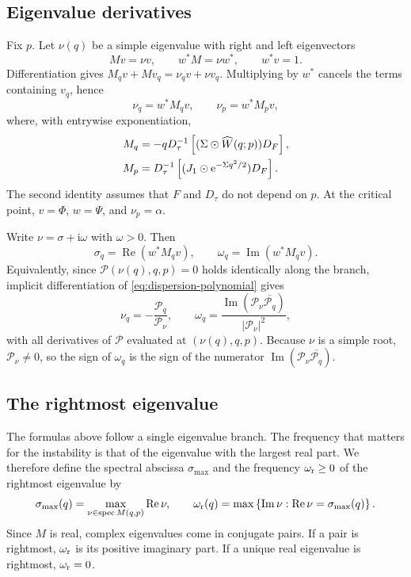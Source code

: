 \documentclass[11pt]{article}
\newcommand{\ii}{\mathrm{i}}
\newcommand{\ee}{\mathrm{e}}
\DeclareMathOperator{\RePart}{Re}
\begin{document}
\subsection{Eigenvalue derivatives}
Fix $p$. Let $\nu(q)$ be a simple eigenvalue with right and left eigenvectors
\begin{equation}
 Mv=\nu v,\qquad w^*M=\nu w^*,\qquad w^*v=1.
\end{equation}
Differentiation gives $M_qv+Mv_q=\nu_qv+\nu v_q$. Multiplying by $w^*$
cancels the terms containing $v_q$, hence
\begin{equation}
 \boxed{\nu_q=w^*M_qv,\qquad \nu_p=w^*M_pv,}
 \label{eq:dispersion-derivatives}
\end{equation}
where, with entrywise exponentiation,
\begin{align}
 M_q&=-qD_\tau^{-1}\left[(\Sigma\odot\widehat W(q;p))D_F\right],\notag\\
 M_p&=D_\tau^{-1}\left[(J_1\odot\ee^{-\Sigma q^2/2})D_F\right].
 \label{eq:dispersion-matrix-derivatives}
\end{align}
The second identity assumes that $F$ and $D_\tau$ do not depend on $p$.
At the critical point, $v=\Phi$, $w=\Psi$, and $\nu_p=\alpha$.

Write $\nu=\sigma+\ii\omega$ with $\omega>0$. Then
\begin{equation}
 \sigma_q=\RePart(w^*M_qv),\qquad
 \boxed{\omega_q=\operatorname{Im}(w^*M_qv).}
 \label{eq:frequency-slope}
\end{equation}
Equivalently, since $\mathcal P(\nu(q),q,p)=0$ holds identically along the
branch, implicit differentiation of \eqref{eq:dispersion-polynomial} gives
\begin{equation}
 \nu_q=-\frac{\mathcal P_q}{\mathcal P_\nu},\qquad
 \boxed{\omega_q=
 \frac{\operatorname{Im}(\mathcal P_\nu\overline{\mathcal P_q})}
 {|\mathcal P_\nu|^2},}
 \label{eq:frequency-polynomial-sign}
\end{equation}
with all derivatives of $\mathcal P$ evaluated at $(\nu(q),q,p)$.
Because $\nu$ is a simple root, $\mathcal P_\nu\neq0$, so the sign of
$\omega_q$ is the sign of the numerator
$\operatorname{Im}(\mathcal P_\nu\overline{\mathcal P_q})$.

\subsection{The rightmost eigenvalue}
The formulas above follow a single eigenvalue branch. The frequency that
matters for the instability is that of the eigenvalue with the largest real
part. We therefore define the spectral abscissa $\sigma_{\max}$ and the
frequency $\omega_{\rm r}\ge0$ of the rightmost eigenvalue by
\begin{equation}
 \sigma_{\max}(q)=\max_{\nu\in\operatorname{spec}M(q,p)}\RePart\nu,
 \qquad
 \omega_{\rm r}(q)=\max\left\{\operatorname{Im}\nu:
 \RePart\nu=\sigma_{\max}(q)\right\}.
 \label{eq:rightmost-frequency}
\end{equation}
Since $M$ is real, complex eigenvalues come in conjugate pairs. If a pair is
rightmost, $\omega_{\rm r}$ is its positive imaginary part. If a unique real
eigenvalue is rightmost, $\omega_{\rm r}=0$.
\end{document}
